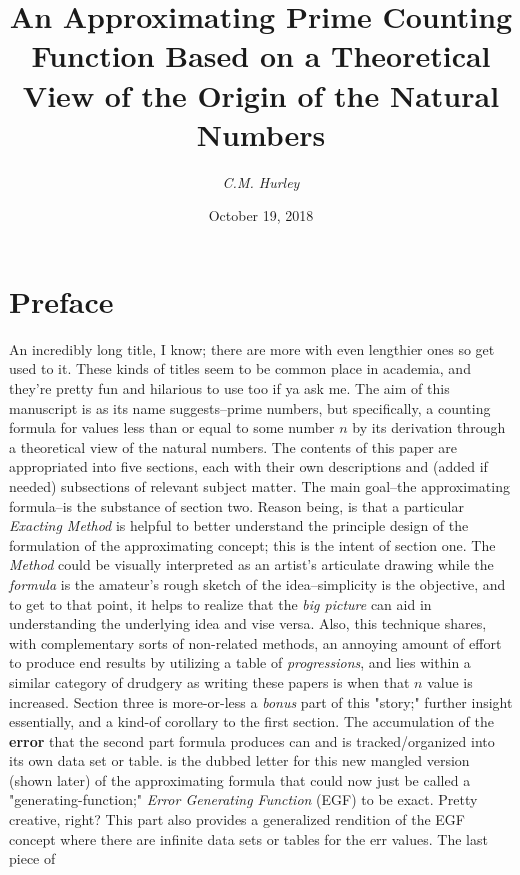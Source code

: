 \documentclass[12pt, letterpaper, twosided]{report}
\title{An Approximating Prime Counting Function Based on a Theoretical View of the Origin of the Natural Numbers}
\author{\textit{C.M. Hurley}}
\date{October 19, 2018}
\begin{document}
	\maketitle
	\tableofcontents

\newpage
\section*{Preface}%
\hspace{0.5cm}An incredibly long title, I know; there are more with even lengthier ones so\hspace{0.15cm} get\hspace{0.15cm} used\hspace{0.15cm} to it. These kinds of titles seem to be common place in academia, and they're pretty fun and hilarious to use too if ya ask me. The aim of this manuscript is as its name suggests--prime numbers, but specifically, a counting formula for values less than or equal to some number $n$ by its derivation through a theoretical view of the natural numbers. The contents of this paper are appropriated into five sections, each with their own descriptions and (added if needed) subsections of relevant subject matter. The main goal--the approximating formula--is\hspace{0.15cm} the\hspace{0.15cm} substance\hspace{0.15cm} of\hspace{0.15cm} section two. Reason being, is that a particular \textit{Exacting Method} is helpful to better understand the principle design of the formulation of the approximating concept; this is the intent of section one. The \textit{Method} could be visually interpreted as an artist's articulate drawing while the \textit{formula} is the amateur's rough sketch of the idea--simplicity is the objective, and to get to that point, it helps to realize that the \textit{big picture} can aid in understanding the underlying idea and vise versa. Also, this technique shares, with complementary sorts of non-related methods, an annoying amount of effort to produce end results by utilizing a table of \textit{progressions}, and lies within a similar category of drudgery as writing these papers is when that $n$ value is increased. Section three is more-or-less a \textit{bonus} part of this "story;" further insight essentially, and a kind-of corollary to the first section. The accumulation of the \textbf{error} that the second part formula produces\hspace{.15cm} can\hspace{.15cm} and\hspace{.15cm} is\hspace{.15cm} tracked/organized into its own data set or table.  is the dubbed letter for this new mangled version (shown later) of the approximating formula that could now just be called a "generating-function;" \textit{Error Generating Function} (EGF) to be exact. Pretty creative, right? This part also provides a generalized rendition of the EGF concept where there are infinite data sets or tables for the err values. The last piece of 
\end{document}
